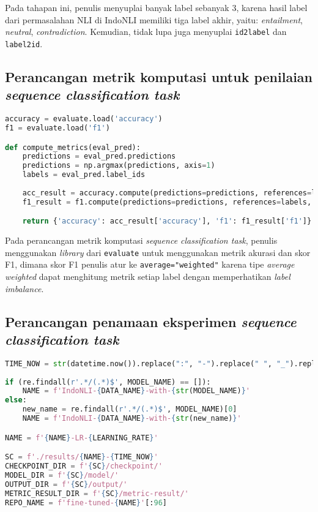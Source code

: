 Pada tahapan ini, penulis menyuplai banyak label sebanyak 3, karena hasil label dari permasalahan NLI di IndoNLI memiliki tiga label akhir, yaitu: \emph{entailment}, \emph{neutral}, \emph{contradiction}. Kemudian, tidak lupa juga menyuplai \texttt{id2label} dan \texttt{label2id}.

\subsection{Perancangan metrik komputasi untuk penilaian \emph{sequence classification task}}
\begin{lstlisting}[language=Python, caption=Perancangan metrik komputasi untuk penilaian \emph{sequence classification task}]
accuracy = evaluate.load('accuracy')
f1 = evaluate.load('f1')

def compute_metrics(eval_pred):
    predictions = eval_pred.predictions
    predictions = np.argmax(predictions, axis=1)
    labels = eval_pred.label_ids
    
    acc_result = accuracy.compute(predictions=predictions, references=labels)
    f1_result = f1.compute(predictions=predictions, references=labels, average="weighted")

    return {'accuracy': acc_result['accuracy'], 'f1': f1_result['f1']}
\end{lstlisting}

Pada perancangan metrik komputasi \emph{sequence classification task}, penulis menggunakan \emph{library} dari \texttt{evaluate} untuk menggunakan metrik akurasi dan skor F1, dimana skor F1 penulis atur ke \texttt{average="weighted"} karena tipe \emph{average weighted} dapat menghitung metrik setiap label dengan memperhatikan \emph{label imbalance}.

\subsection{Perancangan penamaan eksperimen \emph{sequence classification task}}
\begin{lstlisting}[language=Python, caption=Perancangan penamaan eksperimen \emph{sequence classification task}]
TIME_NOW = str(datetime.now()).replace(":", "-").replace(" ", "_").replace(".", "_")
    
if (re.findall(r'.*/(.*)$', MODEL_NAME) == []): 
    NAME = f'IndoNLI-{DATA_NAME}-with-{str(MODEL_NAME)}'
else:
    new_name = re.findall(r'.*/(.*)$', MODEL_NAME)[0]
    NAME = f'IndoNLI-{DATA_NAME}-with-{str(new_name)}'

NAME = f'{NAME}-LR-{LEARNING_RATE}'

SC = f'./results/{NAME}-{TIME_NOW}'
CHECKPOINT_DIR = f'{SC}/checkpoint/'
MODEL_DIR = f'{SC}/model/'
OUTPUT_DIR = f'{SC}/output/'
METRIC_RESULT_DIR = f'{SC}/metric-result/'
REPO_NAME = f'fine-tuned-{NAME}'[:96]
\end{lstlisting}

